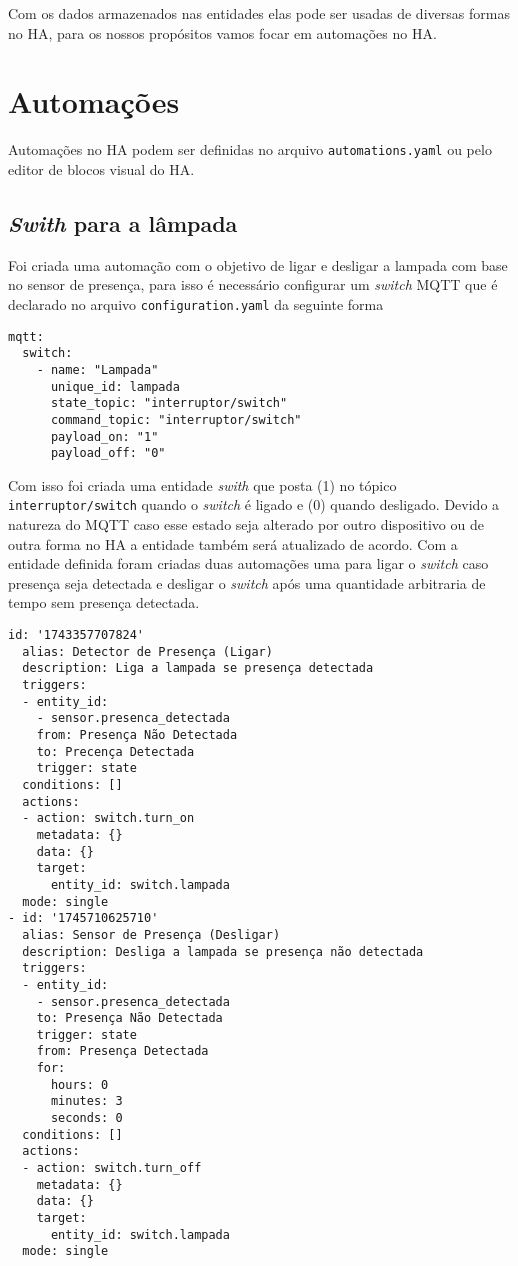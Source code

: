 \documentclass[]{abntex2}
\begin{document}
Com os dados armazenados nas entidades elas pode ser usadas de diversas formas
no HA, para os nossos propósitos vamos focar em automações no HA.

\section{Automações}
Automações no HA podem ser definidas no arquivo \texttt{automations.yaml}
ou pelo editor de blocos visual do HA.

\subsection{\textit{Swith} para a lâmpada}

Foi criada uma automação com o objetivo de ligar e desligar a lampada com
base no sensor de presença, para isso é necessário configurar um \textit{switch} MQTT
que é declarado no arquivo \texttt{configuration.yaml} da seguinte forma
\clearpage
\begin{verbatim}
mqtt:
  switch:
    - name: "Lampada"
      unique_id: lampada
      state_topic: "interruptor/switch"
      command_topic: "interruptor/switch"
      payload_on: "1"
      payload_off: "0"
\end{verbatim}
Com isso foi criada uma entidade \textit{swith} que posta (1) no tópico
\texttt{interruptor/switch} quando o \textit{switch} é ligado e (0) quando
desligado. Devido a natureza do MQTT caso esse estado seja alterado por outro
dispositivo ou de outra forma no HA a entidade também será atualizado de
acordo. Com a entidade definida foram criadas duas automações uma para ligar o
\textit{switch} caso presença seja detectada e desligar o \textit{switch} após
uma quantidade arbitraria de tempo sem presença detectada.

\begin{verbatim}
id: '1743357707824'
  alias: Detector de Presença (Ligar)
  description: Liga a lampada se presença detectada
  triggers:
  - entity_id:
    - sensor.presenca_detectada
    from: Presença Não Detectada
    to: Precença Detectada
    trigger: state
  conditions: []
  actions:
  - action: switch.turn_on
    metadata: {}
    data: {}
    target:
      entity_id: switch.lampada
  mode: single
- id: '1745710625710'
  alias: Sensor de Presença (Desligar)
  description: Desliga a lampada se presença não detectada
  triggers:
  - entity_id:
    - sensor.presenca_detectada
    to: Presença Não Detectada
    trigger: state
    from: Presença Detectada
    for:
      hours: 0
      minutes: 3
      seconds: 0
  conditions: []
  actions:
  - action: switch.turn_off
    metadata: {}
    data: {}
    target:
      entity_id: switch.lampada
  mode: single
\end{verbatim}
\clearpage
\end{document}
